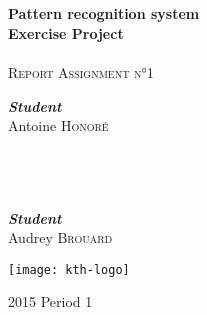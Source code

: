 \begin{titlepage}
  \begin{sffamily}
    \begin{center}

      \textsc{ }\\[1.5cm]

      \HRule \\[0.4cm]
      { \Huge \bfseries Pattern recognition system\\Exercise Project\\[0.4cm] }
      \HRule \\[2.5cm]
      \textsc{\LARGE Report Assignment n°1}~\\[2.5cm]
      \begin{minipage}{0.4\textwidth}
        \begin{flushleft} \large
          \emph{\textbf{Student}}\\
          Antoine \textsc{Honoré}\\
          ~\\~\\~\\
        \end{flushleft}
      \end{minipage}
      \hfill
      \begin{minipage}{0.4\textwidth}
        \begin{flushright} \large
          \emph{\textbf{Student}}\\
          Audrey \textsc{Brouard}\\
        \end{flushright}
      \end{minipage}
      \texttt{[image: kth-logo]}

     

      \vfill

      {\large 2015 Period 1}

    \end{center}
  \end{sffamily}

\end{titlepage}


